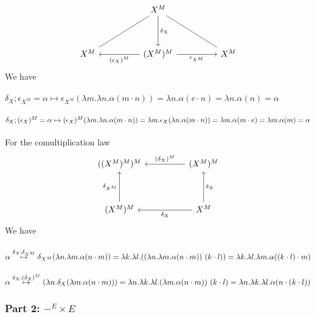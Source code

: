\documentclass{article}
\begin{document}
\[\begin{tikzcd}
	&& {X^M} \\
	\\
	{X^M} && {(X^M)^M} && {X^M}
	\arrow[no head, from=3-1, to=1-3]
	\arrow[no head, from=1-3, to=3-5]
	\arrow["{\delta_X}", from=1-3, to=3-3]
	\arrow["{(\epsilon_X)^M}", from=3-3, to=3-1]
	\arrow["{\epsilon_{X^M}}"', from=3-3, to=3-5]
\end{tikzcd}\]
We have\\~\\
$\delta_X;\epsilon_{X^M} = \alpha \mapsto \epsilon_{X^M}(\lambda m. \lambda n. \alpha(m \cdot n)) = \lambda n. \alpha(e \cdot n) = \lambda n.\alpha(n) = \alpha$
\\~\\
$\delta_X;(\epsilon_X)^M = \alpha \mapsto (\epsilon_X)^M(\lambda m. \lambda n. \alpha(m \cdot n)) = \lambda m. \epsilon_X(\lambda n. \alpha(m \cdot n)) = \lambda m. \alpha(m \cdot e)\\ = \lambda m. \alpha(m) = \alpha$\\~\\
For the comultiplication law
\[\begin{tikzcd}
	{((X^M)^M)^M} && {(X^M)^M} \\
	\\
	{(X^M)^M} && {X^M}
	\arrow["{\delta_X}", from=3-3, to=3-1]
	\arrow["{\delta_X}"', from=3-3, to=1-3]
	\arrow["{\delta_{X^M}}", from=3-1, to=1-1]
	\arrow["{(\delta_X)^M}"', from=1-3, to=1-1]
\end{tikzcd}\]
We have\\~\\
$\alpha \overset{\delta_X;\delta_{X^M}}{\mapsto} \delta_{X^M}(\lambda n. \lambda m. \alpha(n \cdot m)) = \lambda k. \lambda l. ((\lambda n. \lambda m. \alpha(n \cdot m))~(k \cdot l))\\ = \lambda k. \lambda l. \lambda m. \alpha((k \cdot l) \cdot m)$\\~\\
$\alpha \overset{\delta_X;(\delta_{X})^M}{\mapsto} (\lambda n. \delta_X(\lambda m. \alpha(n \cdot m))) = \lambda n. \lambda k. \lambda l. (\lambda m. \alpha(n \cdot m))~(k \cdot l) \\ = \lambda n. \lambda k. \lambda l. \alpha(n \cdot (k \cdot l))$

\subsubsection*{Part 2: $-^E \times E$}
\end{document}
